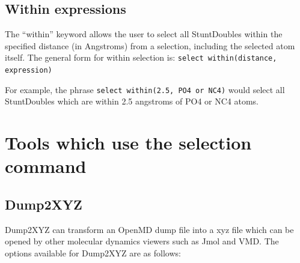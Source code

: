 \documentclass[]{book}
\begin{document}
\subsection{\label{section:within}Within expressions}

The ``within'' keyword allows the user to select all StuntDoubles
within the specified distance (in Angstroms) from a selection,
including the selected atom itself. The general form for within
selection is: {\tt select within(distance, expression)}
 
For example, the phrase {\tt select within(2.5, PO4 or NC4)} would
select all StuntDoubles which are within 2.5 angstroms of PO4 or NC4
atoms.

\section{\label{section:tools}Tools which use the selection command}

\subsection{\label{section:Dump2XYZ}Dump2XYZ}

Dump2XYZ can transform an {\sc OpenMD} dump file into a xyz file which can
be opened by other molecular dynamics viewers such as Jmol and
VMD. The options available for Dump2XYZ are as follows:
\end{document}
